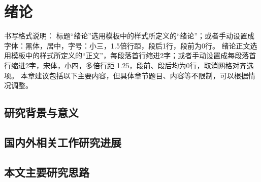 \chapter{绪论}%
%
\label{cha:introduction}
书写格式说明：
标题“绪论”选用模板中的样式所定义的“绪论”；或者手动设置成字体：黑体，居中，字号：小三，1.5倍行距，段后1行，段前为0行。
绪论正文选用模板中的样式所定义的“正文”，每段落首行缩进2字；或者手动设置成每段落首行缩进2字，宋体，小四，多倍行距 1.25，段前、段后均为0行，取消网格对齐选项。
本章建议包括以下主要内容，但具体章节题目、内容等不限制，可以根据情况调整。
\section{研究背景与意义}
%
\label{sec:background}
\section{国内外相关工作研究进展}
%
\label{sec:advance}

\section{本文主要研究思路}
%
\label{sec:the_idea}






